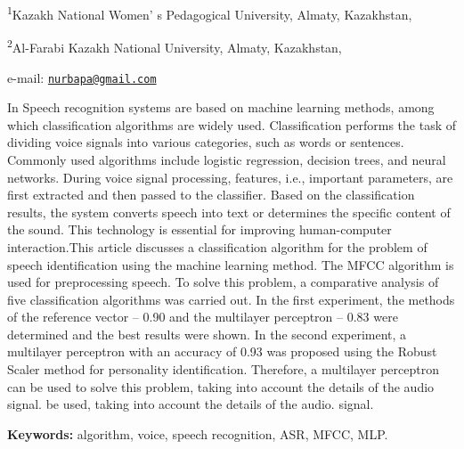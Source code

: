 \begin{affiliation}
\textsuperscript{1}Kazakh National Women' s Pedagogical University, Almaty, Kazakhstan,

\textsuperscript{2}Al-Farabi Kazakh National University, Almaty, Kazakhstan,

e-mail: \href{mailto:nurbapa@gmail.com}{\nolinkurl{nurbapa@gmail.com}}
\end{affiliation}

In Speech recognition systems are based on machine learning methods,
among which classification algorithms are widely used. Classification
performs the task of dividing voice signals into various categories,
such as words or sentences. Commonly used algorithms include logistic
regression, decision trees, and neural networks. During voice signal
processing, features, i.e., important parameters, are first extracted
and then passed to the classifier. Based on the classification results,
the system converts speech into text or determines the specific content
of the sound. This technology is essential for improving human-computer
interaction.This article discusses a classification algorithm for the
problem of speech identification using the machine learning method. The
MFCC algorithm is used for preprocessing speech. To solve this problem,
a comparative analysis of five classification algorithms was carried
out. In the first experiment, the methods of the reference vector --
0.90 and the multilayer perceptron -- 0.83 were determined and the best
results were shown. In the second experiment, a multilayer perceptron
with an accuracy of 0.93 was proposed using the Robust Scaler method for
personality identification. Therefore, a multilayer perceptron can be
used to solve this problem, taking into account the details of the audio
signal. be used, taking into account the details of the audio. signal.

{\bfseries Keywords:} algorithm, voice, speech recognition, ASR, MFCC, MLP.

